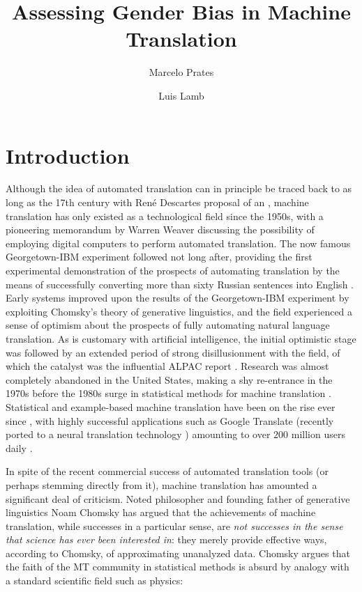 \documentclass{article}
\title{Assessing Gender Bias in Machine Translation}
\author{Marcelo Prates \and Luis Lamb}
\begin{document}
\maketitle

\begin{abstract}
\end{abstract}

\section{Introduction}

Although the idea of automated translation can in principle be traced back to as long as the 17th century with René Descartes proposal of an  \cite{dascal1982universal}, machine translation has only existed as a technological field since the 1950s, with a pioneering memorandum by Warren Weaver \cite{weaver1955translation} discussing the possibility of employing digital computers to perform automated translation. The now famous Georgetown-IBM experiment followed not long after, providing the first experimental demonstration of the prospects of automating translation by the means of successfully converting more than sixty Russian sentences into English \cite{gordin2015scientific}. Early systems improved upon the results of the Georgetown-IBM experiment by exploiting Chomsky's theory of generative linguistics, and the field experienced a sense of optimism about the prospects of fully automating natural language translation. As is customary with artificial intelligence, the initial optimistic stage was followed by an extended period of strong disillusionment with the field, of which the catalyst was the influential ALPAC report \cite{hutchins1986machine}. Research was almost completely abandoned in the United States, making a shy re-entrance in the 1970s before the 1980s surge in statistical methods for machine translation \cite{koehn2009statistical}. Statistical and example-based machine translation have been on the rise ever since \cite{carl2003recent}, with highly successful applications such as Google Translate (recently ported to a neural translation technology \cite{wu2016google}) amounting to over $200$ million users daily \cite{bengio2015deep}.

In spite of the recent commercial success of automated translation tools (or perhaps stemming directly from it), machine translation has amounted a significant deal of criticism. Noted philosopher and founding father of generative linguistics Noam Chomsky has argued that the achievements of machine translation, while successes in a particular sense, are \emph{not successes in the sense that science has ever been interested in}: they merely provide effective ways, according to Chomsky, of approximating unanalyzed data. Chomsky argues that the faith of the MT community in statistical methods is absurd by analogy with a standard scientific field such as physics:
\end{document}
